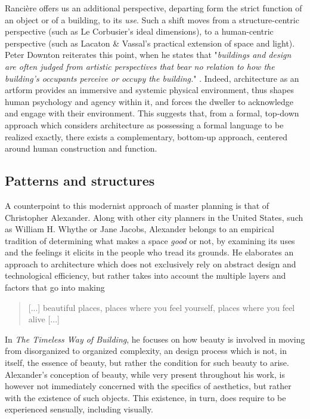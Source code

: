 Rancière offers us an additional perspective, departing form the strict function of an object or of a building, to its \emph{use}. Such a shift moves from a structure-centric perspective (such as Le Corbusier's ideal dimensions), to a human-centric perspective (such as Lacaton \& Vassal's practical extension of space and light). Peter Downton reiterates this point, when he states that "\emph{buildings and design are often judged from artistic perspectives that bear no relation to how the building’s occupants perceive or occupy the building.}" \citep{downton_knowledge_1998}. Indeed, architecture as an artform provides an immersive and systemic physical environment, thus shapes human psychology and agency within it, and forces the dweller to acknowledge and engage with their environment. This suggests that, from a formal, top-down approach which considers architecture as possessing a formal language to be realized exactly, there exists a complementary, bottom-up approach, centered around human construction and function.


\subsection{Patterns and structures}
\label{subsec:patterns-structures}

A counterpoint to this modernist approach of master planning is that of Christopher Alexander. Along with other city planners in the United States, such as William H. Whythe or Jane Jacobs, Alexander belongs to an empirical tradition of determining what makes a space \emph{good} or not, by examining its uses and the feelings it elicits in the people who tread its grounds. He elaborates an approach to architecture which does not exclusively rely on abstract design and technological efficiency, but rather takes into account the multiple layers and factors that go into making

\begin{quote}
    [...] beautiful places, places where you feel yourself, places where you feel alive \citep{alexander_timeless_1979} [...]
\end{quote}

In \emph{The Timeless Way of Building}, he focuses on how beauty is involved in moving from disorganized to organized complexity, an design process which is not, in itself, the essence of beauty, but rather the condition for such beauty to arise. Alexander's conception of beauty, while very present throughout his work, is however not immediately concerned with the specifics of aesthetics, but rather with the existence of such objects. This existence, in turn, does require to be experienced sensually, including visually.

